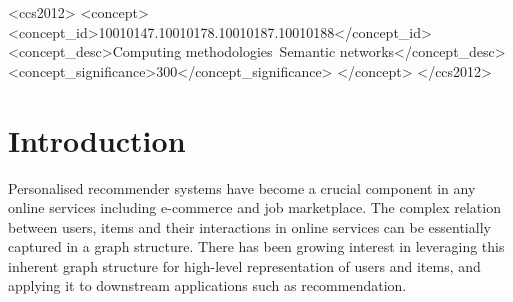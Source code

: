 \documentclass[manuscript,screen,review]{acmart}
\begin{document}
\begin{CCSXML}
<ccs2012>
<concept>
<concept_id>10010147.10010178.10010187.10010188</concept_id>
<concept_desc>Computing methodologies~Semantic networks</concept_desc>
<concept_significance>300</concept_significance>
</concept>
</ccs2012>
\end{CCSXML}




\maketitle

\section{Introduction}
Personalised recommender systems have become a crucial component in any online services including e-commerce and job marketplace. The complex relation between users, items and their interactions in online services can be essentially captured in a graph structure. There has been growing interest in leveraging this inherent graph structure for high-level representation of users and items, and applying it to downstream applications such as recommendation.

\end{document}
